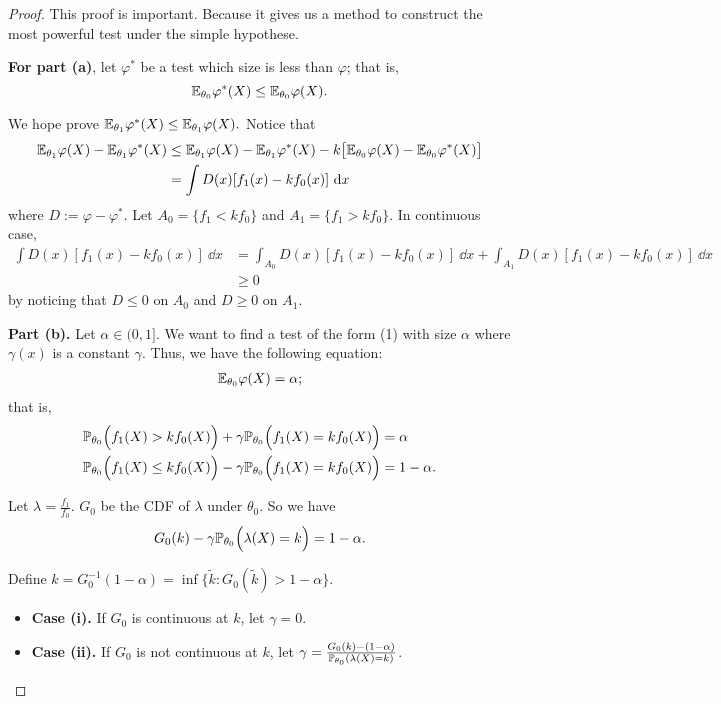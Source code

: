 \begin{proof}
	This proof is important. Because it gives us a method to construct the most powerful test under the simple hypothese.
	
	\textbf{For part (a)}, let $\varphi^\ast$ be a test which size is less than $\varphi$; that is,
	$$\mathbb{E}_{\theta_0} \varphi^\ast(X) \leq \mathbb{E}_{\theta_0} \varphi(X).$$
	
	We hope prove $\mathbb{E}_{\theta_1} \varphi^\ast(X) \leq \mathbb{E}_{\theta_1} \varphi(X).$ Notice that 
	\begin{align*}
		\mathbb{E}_{\theta_1} \varphi(X) - \mathbb{E}_{\theta_1} \varphi^\ast(X) &\leq \mathbb{E}_{\theta_1} \varphi(X) - \mathbb{E}_{\theta_1} \varphi^\ast(X) - k\big[\mathbb{E}_{\theta_0} \varphi(X) - \mathbb{E}_{\theta_0} \varphi^\ast(X)\big] \\
		&=\int D(x)[f_1(x) - kf_0(x) ]\ \mathrm{d} x  
	\end{align*}
	where $D := \varphi - \varphi^\ast$. Let $A_0 = \{ f_1 < k f_0 \}$ and $A_1 = \{ f_1 > k f_0 \}$. In continuous case,
	\begin{align*}
		\int D(x)[f_1(x) - kf_0(x) ]\ \dd x &= \int_{A_0} D(x)[f_1(x) - kf_0(x) ]\ \dd x + \int_{A_1} D(x)[f_1(x) - kf_0(x) ]\ \dd x \\
		&\geq 0
	\end{align*}
	by noticing that $D \leq 0$ on $A_0$ and $D \geq 0$ on $A_1$.
	
	\textbf{Part (b).} Let $\alpha \in (0,1]$. We want to find a test of the form (1) with size $\alpha$ where $\gamma(x)$ is a constant $\gamma$. Thus, we have the following equation:
	\begin{align*}
		\mathbb{E}_{\theta_0} \varphi(X) = \alpha;
	\end{align*}
	that is,
	\begin{align*}
		\mathbb{P}_{\theta_0} \Big( f_1(X) > k f_0(X) \Big) + \gamma \mathbb{P}_{\theta_0} \Big( f_1(X) = k f_0(X) \Big) &= \alpha \\
	\mathbb{P}_{\theta_0} \Big( f_1(X) \leq k f_0(X) \Big) -\gamma \mathbb{P}_{\theta_0} \Big( f_1(X) = k f_0(X) \Big)	 &= 1 - \alpha. \\
	\end{align*}
	
	Let $\lambda = \frac{f_1}{f_0}$. $G_0$ be the CDF of $\lambda$ under $\theta_0$. So we have
	{\color{blue}
		\begin{align}
		G_0(k) - \gamma \mathbb{P}_{\theta_0} \Big( \lambda(X) = k \Big) = 1 - \alpha.
		\end{align}}
	
	Define $k = G^{-1}_0(1-\alpha) = \inf \{ \tilde{k}: G_0(\tilde{k}) > 1- \alpha \}$.
	
	\begin{itemize}
		\item \textbf{Case (i).} If $G_0$ is continuous at $k$, let $\gamma =0$.
		
		\item \textbf{Case (ii).} If $G_0$ is not continuous at $k$, let $\gamma = \frac{G_0(k) - (1-\alpha)}{ \mathbb{P}_{\theta_0} ( \lambda(X) = k ) }$.
	\end{itemize}
\end{proof}

